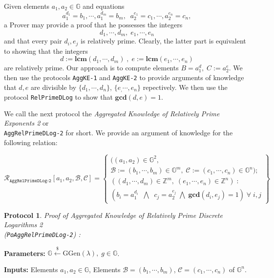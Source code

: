 \documentclass[11pt, lettersize, notitlepage, leqno, footskip=0.6cm]{article}
\newcommand{\bz}{\mathbb Z}
\newcommand{\ttt}{\texttt}
\newcommand{\mc}{\mathcal}
\newcommand{\mb}{\mathbb}
\newcommand{\mbf}{\mathbf}
\newcommand{\mr}{\mathrm}
\newcommand{\lamb}{\lambda}
\newcommand{\vs}{\vspace{-0.15cm}}
\newcommand{\noin}{\noindent}
\newcommand{\LCM}{\mbf{lcm}}
\newcommand{\GCD}{\mbf{gcd}}
\newtheorem{Prot}[Thm]{Protocol}
\numberwithin{equation}{section}
\begin{document}
\bigskip

\noin Given elements $a_1, a_2\in \mb{G}$ and equations \vspace{-0.15cm}$$a_1^{d_1} = b_1,\cdots, a_1^{d_m}= b_m,\;\; a_2^{e_1} = c_1,\cdots, a_2^{e_n} = c_n,$$ a Prover may provide a proof that he possesses the integers \vs $$d_1,\cdots, d_m,\;e_1,\cdots, e_n$$ and that every pair $d_i, e_j$ is relatively prime. Clearly, the latter part is equivalent to showing that the integers \vs $$d:=\LCM(d_1,\cdots, d_m)\;,\;e:=\LCM(e_1,\cdots, e_n)$$ are relatively prime. Our approach is to compute elements $B = a_1^d,\;C:= a_2^{e}$. We then use the protocols \verb|AggKE-1| and \verb|AggKE-2| to provide arguments of knowledge that $d, e$ are divisible by $\{d_1,\cdots, d_n \}$, $\{e_,\cdots,e_n \}$ repectively. We then  use the protocol \verb|RelPrimeDLog| to show that $\GCD(d, e) = 1$.


We call the next protocol the \textit{Aggregated Knowledge of Relatively Prime Exponents 2} or\\ \verb|AggRelPrimeDLog-2| for short. We provide an argument of knowledge for the following relation:\vspace{-0.2cm}

\[
  \mc{R}_{\ttt{AggRelPrimeDLog-2}}[a_1, a_2, \mc{B}, \mc{C}] = \left\{\begin{array}{l}
    ((a_1,a_2)\in\mb{G}^2,\;\\
     \mc{B}:=(b_1,\cdots, b_m)\in\mb{G}^m,\;\mc{C}:= (c_1,\cdots, c_n)\in\mb{G}^n);\\
    ((d_1,\cdots,d_m)\in\bz^m,\; (e_1,\cdots,e_n)\in\bz^n)\;: \\
    (b_i = a_1^{d_i}\;\;\bigwedge\;\; c_j = a_2^{e_j}\;\bigwedge\; \GCD(d_i, e_j) = 1)\;\forall \;i,j   	
  \end{array}\right\}
\] 

\vspace{0.2cm}

\begin{Prot} \normalfont \textit{Proof of Aggregated Knowledge of Relatively Prime Discrete Logarithms 2}\\ (\verb|PoAggRelPrimeDLog-2|) :\end{Prot}\vspace{-0.3cm}

\noindent \textbf{Parameters:} $\mb{G}\xleftarrow{\$} \mr{GGen}(\lamb), \; g\in \mb{G}$.

\noindent \textbf{Inputs:} Elements $a_1, a_2\in \mb{G}$, Elements $\mc{B} = (b_1,\cdots, b_m)$, $\mc{C} = (c_1,\cdots, c_n)$ of $\mb{G}^n$.
\end{document}
